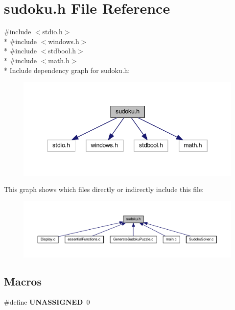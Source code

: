 \section{sudoku.\+h File Reference}
\label{sudoku_8h}
{\ttfamily \#include $<$stdio.\+h$>$}\\*
{\ttfamily \#include $<$windows.\+h$>$}\\*
{\ttfamily \#include $<$stdbool.\+h$>$}\\*
{\ttfamily \#include $<$math.\+h$>$}\\*
Include dependency graph for sudoku.\+h\+:
\nopagebreak
\begin{figure}[H]
\begin{center}
\leavevmode
\includegraphics[width=345pt]{sudoku_8h__incl}
\end{center}
\end{figure}
This graph shows which files directly or indirectly include this file\+:
\nopagebreak
\begin{figure}[H]
\begin{center}
\leavevmode
\includegraphics[width=350pt]{sudoku_8h__dep__incl}
\end{center}
\end{figure}
\subsection*{Macros}
\begin{DoxyCompactItemize}
\item 
\#define {\bf U\+N\+A\+S\+S\+I\+G\+N\+ED}~0
\end{DoxyCompactItemize}
